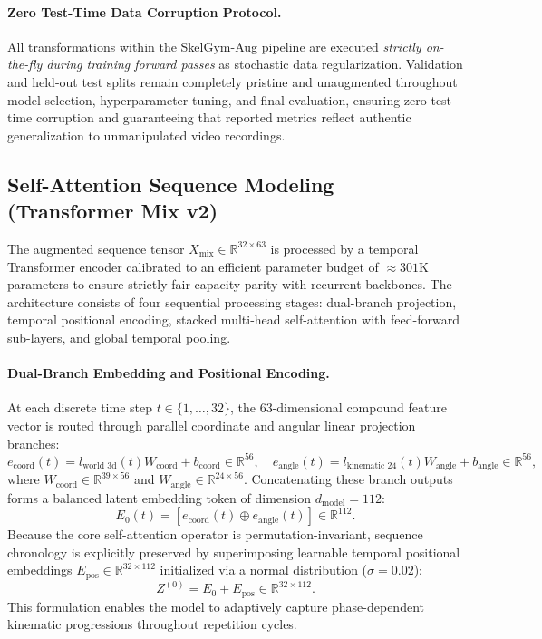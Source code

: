 \documentclass[preprint,12pt]{elsarticle}
\begin{document}
\paragraph{Zero Test-Time Data Corruption Protocol.}
All transformations within the SkelGym-Aug pipeline are executed \textit{strictly on-the-fly during training forward passes} as stochastic data regularization. Validation and held-out test splits remain completely pristine and unaugmented throughout model selection, hyperparameter tuning, and final evaluation, ensuring zero test-time corruption and guaranteeing that reported metrics reflect authentic generalization to unmanipulated video recordings.

\subsection{Self-Attention Sequence Modeling (Transformer Mix v2)}
The augmented sequence tensor $X_{\text{mix}} \in \mathbb{R}^{32 \times 63}$ is processed by a temporal Transformer encoder \cite{vaswani2017} calibrated to an efficient parameter budget of $\approx 301\text{K}$ parameters to ensure strictly fair capacity parity with recurrent backbones. The architecture consists of four sequential processing stages: dual-branch projection, temporal positional encoding, stacked multi-head self-attention with feed-forward sub-layers, and global temporal pooling.

\paragraph{Dual-Branch Embedding and Positional Encoding.} At each discrete time step $t \in \{1, \dots, 32\}$, the 63-dimensional compound feature vector is routed through parallel coordinate and angular linear projection branches:
\begin{equation}
    e_{\text{coord}}(t) = l_{\text{world\_3d}}(t) W_{\text{coord}} + b_{\text{coord}} \in \mathbb{R}^{56}, \quad e_{\text{angle}}(t) = l_{\text{kinematic\_24}}(t) W_{\text{angle}} + b_{\text{angle}} \in \mathbb{R}^{56},
\end{equation}
where $W_{\text{coord}} \in \mathbb{R}^{39 \times 56}$ and $W_{\text{angle}} \in \mathbb{R}^{24 \times 56}$. Concatenating these branch outputs forms a balanced latent embedding token of dimension $d_{\text{model}} = 112$:
\begin{equation}
    E_0(t) = \left[ e_{\text{coord}}(t) \oplus e_{\text{angle}}(t) \right] \in \mathbb{R}^{112}.
\end{equation}
Because the core self-attention operator is permutation-invariant, sequence chronology is explicitly preserved by superimposing learnable temporal positional embeddings $E_{\text{pos}} \in \mathbb{R}^{32 \times 112}$ initialized via a normal distribution ($\sigma = 0.02$):
\begin{equation}
    Z^{(0)} = E_0 + E_{\text{pos}} \in \mathbb{R}^{32 \times 112}.
\end{equation}
This formulation enables the model to adaptively capture phase-dependent kinematic progressions throughout repetition cycles.
\end{document}
